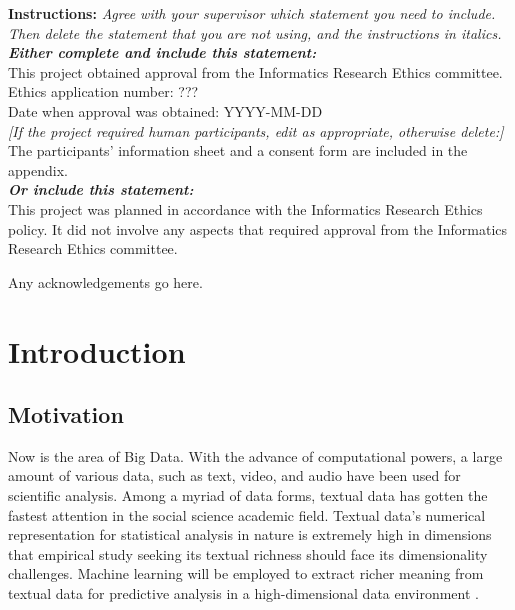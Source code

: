 \documentclass[logo,bsc,singlespacing,parskip]{infthesis}
\begin{document}
\begin{preliminary}
\begin{ethics}
\textbf{Instructions:} \emph{Agree with your supervisor which
statement you need to include. Then delete the statement that you are not using,
and the instructions in italics.\\
\textbf{Either complete and include this statement:}}\\ %
%
This project obtained approval from the Informatics Research Ethics committee.\\
Ethics application number: ???\\
Date when approval was obtained: YYYY-MM-DD\\
%
\emph{[If the project required human participants, edit as appropriate, otherwise delete:]}\\ %
The participants' information sheet and a consent form are included in the appendix.\\
%
\textbf{\emph{Or include this statement:}}\\ %
This project was planned in accordance with the Informatics Research
Ethics policy. It did not involve any aspects that required approval
from the Informatics Research Ethics committee.

\standarddeclaration
\end{ethics}


\begin{acknowledgements}
Any acknowledgements go here.
\end{acknowledgements}



\tableofcontents
\end{preliminary}


\chapter{Introduction}
\section{Motivation}

Now is the area of Big Data. With the advance of computational powers, a large amount of various data, such as text, video, and audio have been used for scientific analysis. Among a myriad of data forms, textual data has gotten the fastest attention in the social science academic field. Textual data’s numerical representation for statistical analysis in nature is extremely high in dimensions that empirical study seeking its textual richness should face its dimensionality challenges. Machine learning will be employed to extract richer meaning from textual data for predictive analysis in a high-dimensional data environment \cite{ke2020predicting}. 
\end{document}
